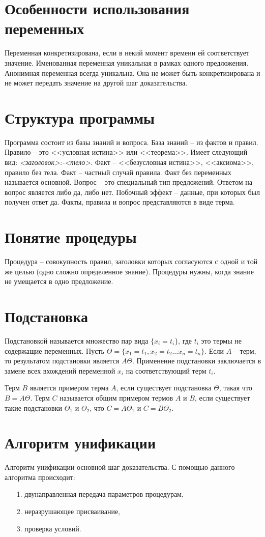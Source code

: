 \section{Особенности использования переменных}
Переменная конкретизирована, если в некий момент времени ей соответствует значение. Именованная переменная уникальная в рамках одного предложения. Анонимная переменная всегда уникальна. Она не может быть конкретизирована и не может передать значение на другой шаг доказательства.

\section{Структура программы}
Программа состоит из базы знаний и вопроса. База знаний -- из фактов и правил.
Правило -- это <<условная истина>> или <<теорема>>. Имеет следующий вид: \textit{<заголовок>:-<тело>}.
Факт -- <<безусловная истина>>, <<аксиома>>, правило без тела. Факт -- частный случай
правила.
Факт без переменных называется основной.
Вопрос -- это специальный тип предложений. Ответом на вопрос является либо да, либо нет. Побочный эффект -- данные, при которых был получен ответ да. 
Факты, правила и вопрос представляются в виде терма.

\section{Понятие процедуры}
Процедура -- совокупность правил, заголовки которых согласуются с одной и той же целью (одно сложно определенное знание). Процедуры нужны, когда знание не умещается в одно предложение.

\section{Подстановка}
Подстановкой называется множество пар вида \(\{x_i = t_i\}\), где \(t_i\) это термы не содержащие переменных. Пусть \(\Theta=\{x_1 = t_1, x_2 = t_2 ... x_n = t_n\}\). Если \(A\) -- терм, то результатом подстановки является \(A\Theta\). Применение подстановки заключается в замене всех вхождений переменной \(x_i\) на соответствующий терм \(t_i\). 

Терм \(B\) является примером терма \(A\), если существует подстановка \(\Theta\), такая что \(B=A\Theta\). Терм \(C\) называется общим примером термов \(A\) и \(B\), если существует такие подстановки \(\Theta_1\) и \(\Theta_2 \), что \(C=A\Theta_1 \) и \(C=B\Theta_2 \).

\section{Алгоритм унификации}
Алгоритм унификации основной шаг доказательства. С помощью данного алгоритма происходит:
\begin{itemize}
	\item [1.] двунаправленная передача параметров процедурам,
	\item [2.] неразрушающее присваивание,
	\item [3.] проверка условий.
\end{itemize}

